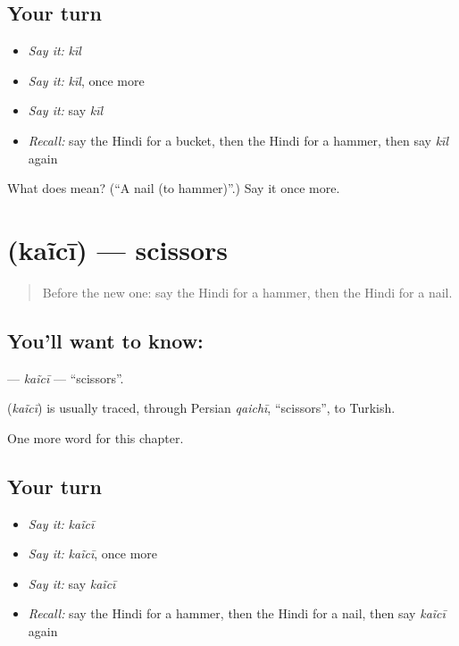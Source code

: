 \subsection*{Your turn}
\begin{itemize}
\raggedright
  \item \emph{Say it:} \emph{kīl}
  \item \emph{Say it:} \emph{kīl}, once more
  \item \emph{Say it:} say \emph{kīl}
  \item \emph{Recall:} say the Hindi for a bucket, then the Hindi for a hammer, then say \emph{kīl} again
\end{itemize}

\begin{tcolorbox}[breakable,colback=teal!4,colframe=teal!35!black,title={Before you move on}]
What does  mean? (\textquotedblleft{}A nail (to hammer)\textquotedblright{}.) Say it once more.
\end{tcolorbox}
\section[\texorpdfstring{\hi{कैंची} (kaĩcī)}{कैंची (kaĩcī)}]{ (kaĩcī) — scissors}

\label{lesson:HI-C130-kaici}



\begin{quote}
Before the new one: say the Hindi for a hammer, then the Hindi for a nail.
\end{quote}

\subsection*{You'll want to know: }
\textbf{} — \emph{kaĩcī} — \textquotedblleft{}scissors\textquotedblright{}.

\begin{cousinweb}
\textbf{} (\emph{kaĩcī}) is usually traced, through Persian \emph{qaichī}, \textquotedblleft{}scissors\textquotedblright{}, to Turkish.
\end{cousinweb}

\begin{grammarlens}[title={What you've built}]
One more word for this chapter.
\end{grammarlens}

\subsection*{Your turn}
\begin{itemize}
\raggedright
  \item \emph{Say it:} \emph{kaĩcī}
  \item \emph{Say it:} \emph{kaĩcī}, once more
  \item \emph{Say it:} say \emph{kaĩcī}
  \item \emph{Recall:} say the Hindi for a hammer, then the Hindi for a nail, then say \emph{kaĩcī} again
\end{itemize}

